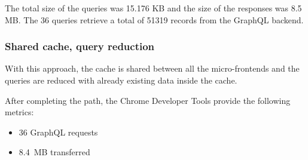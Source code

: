 \documentclass[MSE,Master,english]{twbook}%
\begin{document}
\ifshowUnusedContent



\fi

The total size of the queries was 15.176 KB and the size of the responses was 8.5 MB. The 36 queries retrieve a total of 51319 records from the GraphQL backend.

\subsubsection{Shared cache, query reduction}

With this approach, the cache is shared between all the micro-frontends and the queries are reduced with already existing data inside the cache.

After completing the path, the Chrome Developer Tools provide the following metrics:

\begin{itemize}
    \item 36 GraphQL requests
    \item 8.4 MB transferred
\end{itemize}

\ifshowUnusedContent

\end{document}

